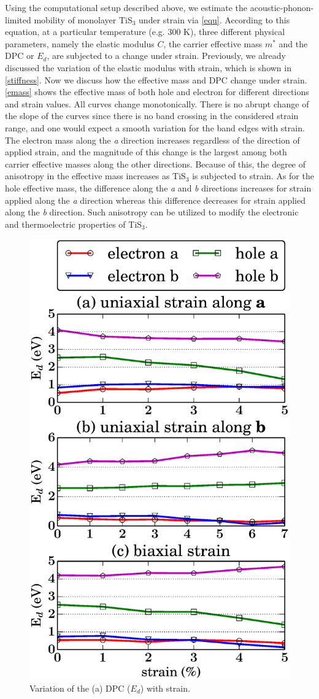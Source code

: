 Using the computational setup described above, we estimate the acoustic-phonon-limited mobility of monolayer TiS$_3$ under  strain via \autoref{equ}. According to this equation, at a particular temperature (e.g. 300 K),  three different physical parameters, namely the elastic modulus $C$, the carrier effective mass $m^*$ and the DPC or $E_d$, are subjected to a change under strain. Previously, we already discussed the variation of the elastic modulus with strain, which is shown in \autoref{stiffness}. Now we discuss how the effective mass and DPC change under strain. \autoref{emass} shows the effective mass of both hole and electron for different directions and strain values. All curves change monotonically. There is no abrupt change of the slope of the curves since there is no band crossing in the considered strain range, and one would expect a smooth variation for the band edges with strain. The electron mass along the \textit{a} direction increases regardless of the direction of applied strain, and the magnitude of this change is the largest among both carrier effective masses along the other directions. Because of this, the degree of anisotropy in the effective mass increases as TiS$_3$ is subjected to strain. As for the hole effective mass, the difference along the \textit{a} and \textit{b} directions increases for strain applied along the \textit{a} direction whereas this difference decreases for strain applied along the \textit{b} direction. Such anisotropy can be utilized to modify the electronic and thermoelectric properties of TiS$_3$.  

\begin{figure}[htb]
\centering
\includegraphics[width=0.6\linewidth]{Mob_dePotential.eps}
\caption{Variation of the (a) DPC ($E_d$) with strain. \label{dePotential}}
\end{figure}

